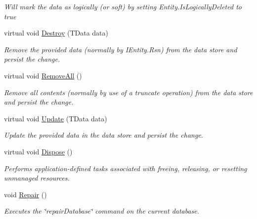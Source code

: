 \begin{DoxyCompactItemize}
\begin{DoxyCompactList}\small\item\em Will mark the {\itshape data}  as logically (or soft) by setting Entity.\+Is\+Logically\+Deleted to true \end{DoxyCompactList}\item 
virtual void \hyperlink{classCqrs_1_1MongoDB_1_1DataStores_1_1MongoDbDataStore_a4650c780f34e320ba39f312e3b04555d_a4650c780f34e320ba39f312e3b04555d}{Destroy} (T\+Data data)
\begin{DoxyCompactList}\small\item\em Remove the provided {\itshape data}  (normally by I\+Entity.\+Rsn) from the data store and persist the change. \end{DoxyCompactList}\item 
virtual void \hyperlink{classCqrs_1_1MongoDB_1_1DataStores_1_1MongoDbDataStore_ac0cb8626e8f8ab0275a31e88a920ee3e_ac0cb8626e8f8ab0275a31e88a920ee3e}{Remove\+All} ()
\begin{DoxyCompactList}\small\item\em Remove all contents (normally by use of a truncate operation) from the data store and persist the change. \end{DoxyCompactList}\item 
virtual void \hyperlink{classCqrs_1_1MongoDB_1_1DataStores_1_1MongoDbDataStore_af86a3df56e2df92fb9ef880ff4fa5f16_af86a3df56e2df92fb9ef880ff4fa5f16}{Update} (T\+Data data)
\begin{DoxyCompactList}\small\item\em Update the provided {\itshape data}  in the data store and persist the change. \end{DoxyCompactList}\item 
virtual void \hyperlink{classCqrs_1_1MongoDB_1_1DataStores_1_1MongoDbDataStore_a5003aba35b02f686cbacf5832a14cf46_a5003aba35b02f686cbacf5832a14cf46}{Dispose} ()
\begin{DoxyCompactList}\small\item\em Performs application-\/defined tasks associated with freeing, releasing, or resetting unmanaged resources. \end{DoxyCompactList}\item 
void \hyperlink{classCqrs_1_1MongoDB_1_1DataStores_1_1MongoDbDataStore_a2fef1856a801d2f247ed5b0a0f3bea9a_a2fef1856a801d2f247ed5b0a0f3bea9a}{Repair} ()
\begin{DoxyCompactList}\small\item\em Executes the \char`\"{}repair\+Database\char`\"{} command on the current database. \end{DoxyCompactList}\end{DoxyCompactItemize}

